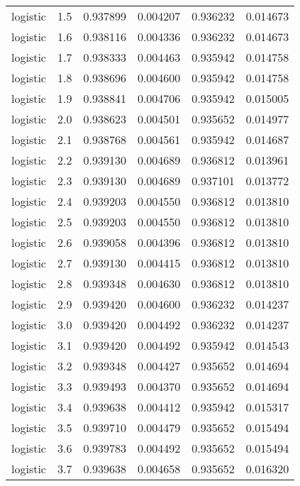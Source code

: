 \begin{tabular}{lrrrrr}
logistic &        1.5 &    0.937899 &   0.004207 &   0.936232 &  0.014673 \\
logistic &        1.6 &    0.938116 &   0.004336 &   0.936232 &  0.014673 \\
logistic &        1.7 &    0.938333 &   0.004463 &   0.935942 &  0.014758 \\
logistic &        1.8 &    0.938696 &   0.004600 &   0.935942 &  0.014758 \\
logistic &        1.9 &    0.938841 &   0.004706 &   0.935942 &  0.015005 \\
logistic &        2.0 &    0.938623 &   0.004501 &   0.935652 &  0.014977 \\
logistic &        2.1 &    0.938768 &   0.004561 &   0.935942 &  0.014687 \\
logistic &        2.2 &    0.939130 &   0.004689 &   0.936812 &  0.013961 \\
logistic &        2.3 &    0.939130 &   0.004689 &   0.937101 &  0.013772 \\
logistic &        2.4 &    0.939203 &   0.004550 &   0.936812 &  0.013810 \\
logistic &        2.5 &    0.939203 &   0.004550 &   0.936812 &  0.013810 \\
logistic &        2.6 &    0.939058 &   0.004396 &   0.936812 &  0.013810 \\
logistic &        2.7 &    0.939130 &   0.004415 &   0.936812 &  0.013810 \\
logistic &        2.8 &    0.939348 &   0.004630 &   0.936812 &  0.013810 \\
logistic &        2.9 &    0.939420 &   0.004600 &   0.936232 &  0.014237 \\
logistic &        3.0 &    0.939420 &   0.004492 &   0.936232 &  0.014237 \\
logistic &        3.1 &    0.939420 &   0.004492 &   0.935942 &  0.014543 \\
logistic &        3.2 &    0.939348 &   0.004427 &   0.935652 &  0.014694 \\
logistic &        3.3 &    0.939493 &   0.004370 &   0.935652 &  0.014694 \\
logistic &        3.4 &    0.939638 &   0.004412 &   0.935942 &  0.015317 \\
logistic &        3.5 &    0.939710 &   0.004479 &   0.935652 &  0.015494 \\
logistic &        3.6 &    0.939783 &   0.004492 &   0.935652 &  0.015494 \\
logistic &        3.7 &    0.939638 &   0.004658 &   0.935652 &  0.016320 \\

\end{tabular}
